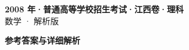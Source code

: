 \documentclass[zihao=-4, a4paper]{ctexart}
\begin{document}
\begin{center}
  {\Large\bfseries 2008 年·普通高等学校招生考试·江西卷·理科}\\[4pt]
  {\large 数学 · 解析版}
\end{center}
\medskip
{}

\clearpage
{}
\begin{center}{\Large\bfseries 参考答案与详细解析}\end{center}
\medskip

\end{document}
